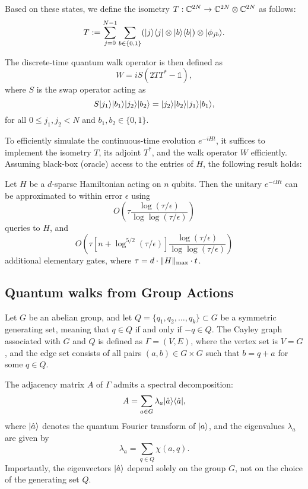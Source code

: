 \documentclass[11pt]{article}
\theoremstyle{definition}
\begin{document}
Based on these states, we define the isometry \( T : \mathbb{C}^{2N} \to \mathbb{C}^{2N} \otimes \mathbb{C}^{2N} \) as follows:
\begin{equation}
    \label{eq:walk-isom}
    T := \sum_{j = 0}^{N - 1} \sum_{b \in \{0, 1\}} (\lvert j\rangle\langle j\rvert \otimes \lvert b\rangle\langle b\rvert) \otimes \lvert\phi_{jb}\rangle.
\end{equation}

The discrete-time quantum walk operator is then defined as
\[
W = iS(2TT^* - \mathds{1}),
\]
where \( S \) is the swap operator acting as
\[
S \lvert j_1\rangle \lvert b_1\rangle \lvert j_2\rangle \lvert b_2\rangle = \lvert j_2\rangle \lvert b_2\rangle \lvert j_1\rangle \lvert b_1\rangle,
\]
for all \( 0 \le j_1, j_2 < N \) and \( b_1, b_2 \in \{0, 1\} \).

To efficiently simulate the continuous-time evolution \( e^{-iHt} \), it suffices to implement the isometry \( T \), its adjoint \( T^* \), and the walk operator \( W \) efficiently. Assuming black-box (oracle) access to the entries of \( H \), the following result holds:

\begin{theorem}
\label{thm:sparse-sim}
Let \( H \) be a \( d \)-sparse Hamiltonian acting on \( n \) qubits. Then the unitary \( e^{-iHt} \) can be approximated to within error \( \epsilon \) using
\[
O\left( \tau \frac{\log(\tau / \epsilon)}{\log\log(\tau / \epsilon)} \right)
\]
queries to \( H \), and
\[
O\left( \tau \left[ n + \log^{5 / 2}(\tau / \epsilon) \right] \frac{\log(\tau / \epsilon)}{\log\log(\tau / \epsilon)} \right)
\]
additional elementary gates, where \( \tau = d \cdot \lVert H\rVert_{\mathrm{max}} \cdot t \).
\end{theorem}




\subsection*{Quantum walks from Group Actions}


Let \( G \) be an abelian group, and let \( Q = \{q_1, q_2, \dots, q_k\} \subset G \) be a symmetric generating set, meaning that \( q \in Q \) if and only if \( -q \in Q \). The Cayley graph associated with \( G \) and \( Q \) is defined as \( \Gamma = (V, E) \), where the vertex set is \( V = G \), and the edge set consists of all pairs \( (a, b) \in G \times G \) such that \( b = q + a \) for some \( q \in Q \).

The adjacency matrix \( A \) of \( \Gamma \) admits a spectral decomposition:
\[
A = \sum_{a \in G} \lambda_a \lvert\hat{a}\rangle \langle\hat{a}\rvert,
\]
where \( \lvert\hat{a}\rangle \) denotes the quantum Fourier transform of \( \lvert a\rangle \), and the eigenvalues \( \lambda_a \) are given by
\[
\lambda_a = \sum_{q \in Q} \chi(a, q).
\]
Importantly, the eigenvectors \( \lvert\hat{a}\rangle \) depend solely on the group \( G \), not on the choice of the generating set \( Q \).
\end{document}
